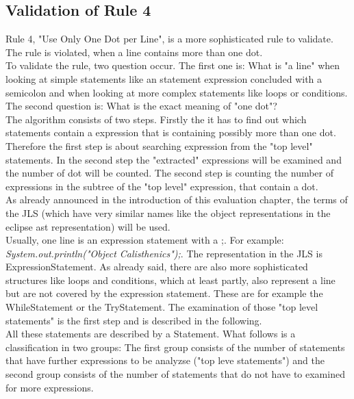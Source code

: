 

\subsection*{Validation of Rule 4}
Rule 4, "Use Only One Dot per Line", is a more sophisticated rule to validate. The rule is violated, when a line contains more than one dot. 
\\

To validate the rule, two question occur. The first one is: What is  "a line" when looking at simple statements like an statement expression concluded with a semicolon and when looking at more complex statements like loops or conditions. The second question is: What is the exact meaning of "one dot"?
\\

The algorithm consists of two steps. Firstly the it has to find out which statements contain a expression that is containing possibly more than one dot. Therefore the first step is about searching expression from the "top level" statements. In the second step the "extracted" expressions will be examined and the number of dot will be counted. The second step is counting the number of expressions in the subtree of the "top level" expression, that contain a dot.
\\

As already announced in the introduction of this evaluation chapter, the terms of the \acf{JLS} (which have very similar names like the object representations in the eclipse ast representation) will be used. 
\\

Usually, one line is an expression statement with a ;. For example: \textit{System.out.println("Object Calisthenics");}. The representation in the \acf{JLS} is ExpressionStatement. As already said, there are also more sophisticated structures like loops and conditions, which at least partly, also represent a line but are not covered by the expression statement. These are for example the WhileStatement or the TryStatement. The examination of those "top level statements" is the first step and is described in the following.
\\

All these statements are described by a Statement. What follows is a classification in two groups: The first group consists of the number of statements that have further expressions to be analyzse ("top leve statements") and the second group consists of the number of statements that do not have to examined for more expressions.
\\

